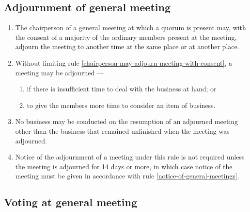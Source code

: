 \documentclass[../constitution.tex]{subfiles}
\begin{document}
\hypertarget{adjournment-of-general-meeting}{%
\subsection{Adjournment of general meeting}\label{adjournment-of-general-meeting}}

\begin{enumerate}

\item The chairperson of a general meeting at which a quorum is present may, with the consent of a majority of the ordinary members present at the meeting, adjourn the meeting to another time at the same place or at another place. \label{chairperson-may-adjourn-meeting-with-consent}
\item Without limiting rule \ref{chairperson-may-adjourn-meeting-with-consent}, a meeting may be adjourned ---

  \begin{enumerate}
  
  \item if there is insufficient time to deal with the business at hand; or
  \item to give the members more time to consider an item of business.
  \end{enumerate}
\item No business may be conducted on the resumption of an adjourned meeting other than the business that remained unfinished when the meeting was adjourned.
\item Notice of the adjournment of a meeting under this rule is not required unless the meeting is adjourned for 14 days or more, in which case notice of the meeting must be given in accordance with rule \ref{notice-of-general-meetings}.
\end{enumerate}

\hypertarget{voting-at-general-meeting}{%
\subsection{Voting at general meeting}\label{voting-at-general-meeting}}
\end{document}
